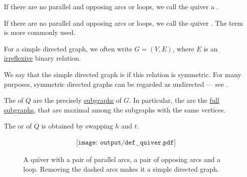 \begin{definition}
\begin{thmenum}
     If there are no parallel and opposing arcs or loops, we call the quiver a .

     If there are no parallel and opposing arcs or loops, we call the quiver . The term  is more commonly used.

    For a simple directed graph, we often write \( G = (V, E) \), where \( E \) is an \hyperref[def:binary_relation/irreflexive]{irreflexive} binary relation.

    We say that the simple directed graph is  if this relation is symmetric. For many purposes, symmetric directed graphs can be regarded as undirected --- see .

     The  of \( Q \) are the precisely \hyperref[def:undirected_multigraph/submodel]{subgraphs} of \( G \). In particular, the  are the \hyperref[def:undirected_multigraph/submodel]{full subgraphs}, that are maximal among the subgraphs with the same vertices.

     The  or  of \( Q \) is obtained by swapping \( h \) and \( t \).
  \end{thmenum}

  \begin{figure}[!ht]
    \begin{equation}\label{eq:fig:def:quiver}
      \begin{aligned}
        \texttt{[image: output/def\_\_quiver.pdf]}
      \end{aligned}
    \end{equation}
    \caption{A quiver with a pair of parallel arcs, a pair of opposing arcs and a loop. Removing the dashed arcs makes it a simple directed graph.}\label{fig:def:quiver}
  \end{figure}
\end{definition}

